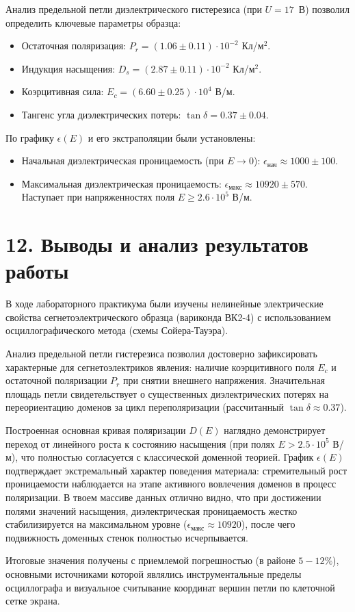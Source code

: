\documentclass[a4paper,12pt]{article}
\begin{document}
\hspace{15pt} Анализ предельной петли диэлектрического гистерезиса (при $U = 17$~В) позволил определить ключевые параметры образца:
\begin{itemize}
    \item Остаточная поляризация: $P_r = (1.06 \pm 0.11) \cdot 10^{-2}$ Кл/м$^2$.
    \item Индукция насыщения: $D_s = (2.87 \pm 0.11) \cdot 10^{-2}$ Кл/м$^2$.
    \item Коэрцитивная сила: $E_c = (6.60 \pm 0.25) \cdot 10^4$ В/м.
    \item Тангенс угла диэлектрических потерь: $\tan \delta = 0.37 \pm 0.04$.
\end{itemize}

По графику $\epsilon(E)$ и его экстраполяции были установлены:
\begin{itemize}
    \item Начальная диэлектрическая проницаемость (при $E \to 0$): $\epsilon_{\text{нач}} \approx 1000 \pm 100$.
    \item Максимальная диэлектрическая проницаемость: $\epsilon_{\text{макс}} \approx 10920 \pm 570$. Наступает при напряженностях поля $E \ge 2.6 \cdot 10^5$ В/м.
\end{itemize}

\section*{\hspace{30pt}12. Выводы и анализ результатов работы}

\hspace{15pt} В ходе лабораторного практикума были изучены нелинейные электрические свойства сегнетоэлектрического образца (вариконда ВК2-4) с использованием осциллографического метода (схемы Сойера-Тауэра). 

\hspace{15pt} Анализ предельной петли гистерезиса позволил достоверно зафиксировать характерные для сегнетоэлектриков явления: наличие коэрцитивного поля $E_c$ и остаточной поляризации $P_r$ при снятии внешнего напряжения. Значительная площадь петли свидетельствует о существенных диэлектрических потерях на переориентацию доменов за цикл переполяризации (рассчитанный $\tan \delta \approx 0.37$).

\hspace{15pt} Построенная основная кривая поляризации $D(E)$ наглядно демонстрирует переход от линейного роста к состоянию насыщения (при полях $E > 2.5 \cdot 10^5$ В/м), что полностью согласуется с классической доменной теорией. График $\epsilon(E)$ подтверждает экстремальный характер поведения материала: стремительный рост проницаемости наблюдается на этапе активного вовлечения доменов в процесс поляризации. В твоем массиве данных отлично видно, что при достижении полями значений насыщения, диэлектрическая проницаемость жестко стабилизируется на максимальном уровне ($\epsilon_{\text{макс}} \approx 10920$), после чего подвижность доменных стенок полностью исчерпывается. 

\hspace{15pt} Итоговые значения получены с приемлемой погрешностью (в районе $5-12\%$), основными источниками которой являлись инструментальные пределы осциллографа и визуальное считывание координат вершин петли по клеточной сетке экрана.
\end{document}
